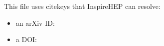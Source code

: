 \documentclass{article}
\begin{document}
This file uses citekeys that InspireHEP can resolve:
\begin{itemize}
  \item an arXiv ID: \cite{1602.03837}
  \item a DOI: \cite{10.1103/PhysRevLett.116.061102}
\end{itemize}



\end{document}
